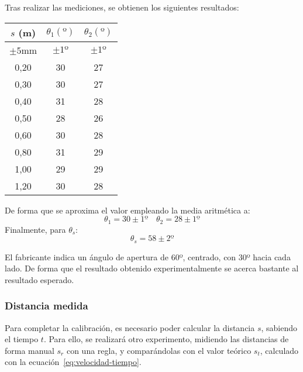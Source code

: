 \documentclass[10pt,a4paper,hidelinks,twocolumn]{article}
\begin{document}
Tras realizar las mediciones, se obtienen los siguientes resultados:
\begin{center}
\begin{tabular}{ | c | c | c | }
\hline
$s$ (m) & $\theta_1(º)$ & $\theta_2(º)$ \\ \hline
$\pm5$mm & $\pm1º$ & $\pm1º$ \\ \hline \hline
0,20 & 30 & 27 \\ \hline
0,30 & 30 & 27 \\ \hline
0,40 & 31 & 28 \\ \hline
0,50 & 28 & 26 \\ \hline
0,60 & 30 & 28 \\ \hline
0,80 & 31 & 29 \\ \hline
1,00 & 29 & 29 \\ \hline
1,20 & 30 & 28 \\ \hline
\end{tabular}
\end{center}

De forma que se aproxima el valor empleando la media aritmética a:
$$ \theta_1 = 30 \pm 1º \quad \theta_2 = 28 \pm 1º $$
Finalmente, para $\theta_s$:
$$\theta_s = 58 \pm 2º$$

El fabricante indica un ángulo de apertura de 60º, centrado, con 30º hacia cada 
lado. De forma que el resultado obtenido experimentalmente se acerca bastante al 
resultado esperado.

%
\subsubsection{Distancia medida}

Para completar la calibración, es necesario poder calcular la distancia $s$,
sabiendo el tiempo $t$. Para ello, se realizará otro experimento, midiendo las
distancias de forma manual $s_r$ con una regla, y comparándolas con el valor
teórico $s_t$, calculado con la ecuación~\ref{eq:velocidad-tiempo}.
\end{document}
